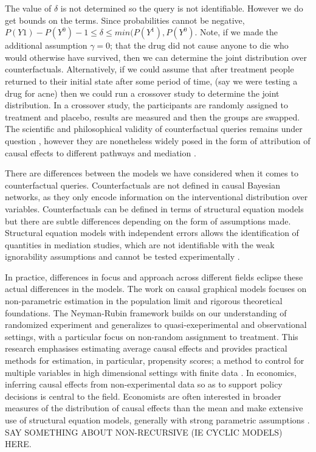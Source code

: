 \documentclass[11pt,a4paper]{article}
\begin{document}
The value of $\delta$ is not determined so the query is not identifiable. However we do get bounds on the terms. Since probabilities cannot be negative, $P(Y{1})-P(Y^{0})-1 \leq \delta \leq min(P(Y^{1}),P(Y^{0})$. Note, if we made the additional assumption $\gamma=0$; that the drug did not cause anyone to die who would otherwise have survived, then we can determine the joint distribution over counterfactuals. Alternatively, if we could assume that after treatment people returned to their initial state after some period of time, (say we were testing a drug for acne) then we could run a crossover study to determine the joint distribution. In a crossover study, the participants are randomly assigned to treatment and placebo, results are measured and then the groups are swapped. The scientific and philosophical validity of counterfactual queries remains under question \cite{Dawid2000,Dawid2014}, however they are nonetheless widely posed in the form of attribution of causal effects to different pathways and mediation \cite{Pearl2014,Imai2010a,VanderWeele2011}. 

There are differences between the models we have considered when it comes to counterfactual queries. Counterfactuals are not defined in causal Bayesian networks, as they only encode information on the interventional distribution over variables.  Counterfactuals can be defined in terms of structural equation models \cite{Pearl2000} but there are subtle differences depending on the form of assumptions made. Structural equation models with independent errors allows the identification of quantities in mediation studies, which are not identifiable with the weak ignorability assumptions and cannot be tested experimentally \cite{Richardson2013}.  

In practice, differences in focus and approach across different fields eclipse these actual differences in the models. The work on causal graphical models \cite{Pearl2000,Sprites} focuses on non-parametric estimation in the population limit and rigorous theoretical foundations. The Neyman-Rubin framework builds on our understanding of randomized experiment and generalizes to quasi-exeperimental and observational settings, with a particular focus on non-random assignment to treatment. This research emphasises estimating average causal effects and provides practical methods for estimation, in particular, propensity scores; a method to control for multiple variables in high dimensional settings with finite data \cite{Rosenbaum1983}. In economics, inferring causal effects from non-experimental data so as to support policy decisions is central to the field. Economists are often interested in broader measures of the distribution of causal effects than the mean and make extensive use of structural equation models, generally with strong parametric assumptions \cite{Heckman2008}. SAY SOMETHING ABOUT NON-RECURSIVE (IE CYCLIC MODELS) HERE.
\end{document}
